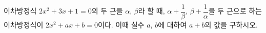 이차방정식 $2x^2+3x+1=0$의 두 근을 $\alpha$, $\beta$라 할 때, $\alpha+\dfrac{1}{\beta}$, $\beta+\dfrac{1}{\alpha}$을 두 근으로 하는 이차방정식이 $2x^2+ax+b=0$이다. 이때 실수 $a$, $b$에 대하여 $a+b$의 값을 구하시오.
